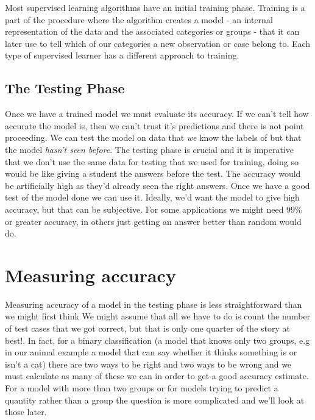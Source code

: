 \documentclass[
]{book}
\begin{document}
Most supervised learning algorithms have an initial training phase. Training is a part of the procedure where the algorithm creates a model - an internal representation of the data and the associated categories or groups - that it can later use to tell which of our categories a new observation or case belong to. Each type of supervised learner has a different approach to training.

\hypertarget{the-testing-phase}{%
\subsection{The Testing Phase}\label{the-testing-phase}}

Once we have a trained model we must evaluate its accuracy. If we can't tell how accurate the model is, then we can't trust it's predictions and there is not point proceeding. We can test the model on data that \emph{we} know the labels of but that the model \emph{hasn't seen before}. The testing phase is crucial and it is imperative that we don't use the same data for testing that we used for training, doing so would be like giving a student the answers before the test. The accuracy would be artificially high as they'd already seen the right answers. Once we have a good test of the model done we can use it. Ideally, we'd want the model to give high accuracy, but that can be subjective. For some applications we might need 99\% or greater accuracy, in others just getting an answer better than random would do.

\hypertarget{measuring-accuracy}{%
\section{Measuring accuracy}\label{measuring-accuracy}}

Measuring accuracy of a model in the testing phase is less straightforward than we might first think We might assume that all we have to do is count the number of test cases that we got correct, but that is only one quarter of the story at best!. In fact, for a binary classification (a model that knows only two groups, e.g in our animal example a model that can say whether it thinks something is or isn't a cat) there are two ways to be right and two ways to be wrong and we must calculate as many of these we can in order to get a good accuracy estimate. For a model with more than two groups or for models trying to predict a quantity rather than a group the question is more complicated and we'll look at those later.
\end{document}
